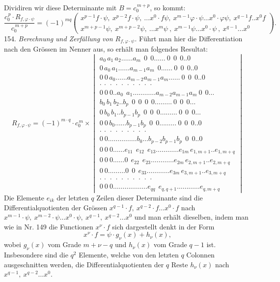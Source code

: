 \documentclass[11pt]{article}
\providecommand{\weq}[2]{\begin{equation}\tag{#1}#2\end{equation}}
\begin{document}
Dividiren wir diese Determinante mit $B = c_0^{\,m+p}$, so kommt:
\[
\frac{c_0^{\,p}\cdot R_{f,\varphi\cdot\psi}}{c_0^{\,m+p}} =
(-1)^{mq}
\begin{pmatrix}
x^{p-1}f\cdot\psi,\ x^{p-2}f\cdot\psi,\ \ldots x^0\cdot f\psi,\ x^{m-1}\varphi\cdot\psi \ldots x^0\cdot\varphi\psi,\ x^{q-1}f..x^0f\\
x^{m+p-1}\psi,\ x^{m+p-2}\psi,\ \ldots x^m\psi\ ,\ x^{m-1}\psi \ldots x^0\cdot\psi\ ,\ x^{q-1}\ldots x^0
\end{pmatrix}.
\]
154. \textit{Berechnung und Zerf\"allung von $R_{f,\varphi\cdot\psi}$.} F\"uhrt man hier die Differentiation nach den Gr\"ossen im Nenner aus, so erh\"alt man folgendes Resultat:
\weq{I}{
R_{f,\varphi\cdot\psi} = (-1)^{m\cdot q}\cdot c_0^{\,m}\times
\begin{vmatrix}
a_0\,a_1\,a_2\ldots\ldots a_m\ \ 0\ \ 0\ldots\ldots\ 0\ \ 0\ \ 0..0\\
0\,a_0\,a_1\ldots\ldots a_{m-1}a_m\ \ 0\ldots\ldots\ 0\ \ 0\ \ 0..0\\
0\ 0\,a_0\ldots\ldots a_{m-2}a_{m-1}a_m\ldots\ldots\ 0\ \ 0\ \ 0..0\\
\cdot\ \cdot\ \cdot\ \cdot\ \cdot\ \cdot\ \cdot\ \cdot\ \cdot\ \cdot\\
0\ 0\ 0..a_0\ \ a_1\ldots\ldots\ldots\ldots a_{m-2}a_{m-1}a_m\ 0\ \ 0\ldots\\
b_0\,b_1\,b_2..b_p\ \ 0\ \ 0\ \ 0\ \ 0\ldots\ldots\ldots\ 0\ \ 0\ \ 0\ldots\\
0\,b_0\,b_1..b_{p-1}b_p\ \ 0\ \ 0\ \ 0\ldots\ldots\ldots\ 0\ \ 0\ \ 0\ldots\\
0\ 0\,b_0\ldots\ldots b_{p-1}b_p\ \ 0\ \ 0\ldots\ldots\ldots\ 0\ \ 0\ \ 0..0\\
\cdot\ \cdot\ \cdot\ \cdot\ \cdot\ \cdot\ \cdot\ \cdot\ \cdot\\
0\ 0\ldots\ldots\ldots\ldots\ldots b_0\ldots b_{p-2}b_{p-1}b_p\ \ 0\ \ 0..0\\
0\ 0\ 0\ldots\ldots e_{11}\ \ e_{12}\ \ e_{13}\ldots\ldots\ldots\ldots e_{1m}\,e_{1,m+1}..e_{1,m+q}\\
0\ 0\ 0\ldots\ldots 0\ \ e_{22}\ \ e_{23}\ldots\ldots\ldots\ldots e_{2m}\,e_{2,m+1}..e_{2,m+q}\\
0\ 0\ldots\ldots\ldots 0\ \ 0\ \ e_{33}\ldots\ldots\ldots\ldots e_{3m}\,e_{3,m+1}..e_{3,m+q}\\
\cdot\ \cdot\ \cdot\ \cdot\ \cdot\ \cdot\ \cdot\ \cdot\ \cdot\ \cdot\\
0\ 0\ 0\ldots\ldots\ldots\ldots\ldots\ldots e_{qq}\ \ e_{q,q+1}\ldots\ldots\ldots\ldots e_{q,m+q}
\end{vmatrix}
}
Die Elemente $e_{ik}$ der letzten $q$ Zeilen dieser Determinante sind die Differentialquotienten der Gr\"ossen $x^{q-1}\cdot f,\ x^{q-2}\cdot f\ldots x^0\cdot f$ nach $x^{m-1}\cdot\psi,\ x^{m-2}\cdot\psi\ldots x^0\cdot\psi,\ x^{q-1},\ x^{q-2}\ldots x^0$ und man erh\"alt dieselben, indem man wie in Nr. 149 die Functionen $x^\nu\cdot f$ sich dargestellt denkt in der Form
\[
x^\nu\cdot f = \psi\cdot g_\nu(x) + h_\nu(x),
\]
wobei $g_\nu(x)$ vom Grade $m+\nu-q$ und $h_\nu(x)$ vom Grade $q-1$ ist. Insbesondere sind die $q^2$ Elemente, welche von den letzten $q$ Colonnen ausgeschnitten werden, die Differentialquotienten der $q$ Reste $h_\nu(x)$ nach $x^{q-1},\ x^{q-2}\ldots x^0$.
\end{document}
